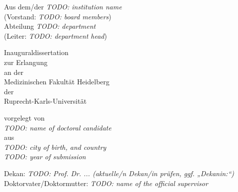 \begin{center}

    Aus dem/der \textit{TODO: institution name} \\

    (Vorstand: \textit{TODO: board members}) \\
    Abteilung \textit{TODO: department} \\
    (Leiter: \textit{TODO: department head})

    \vfill
    
    {\Huge \scshape {\thesistitle \par}} %


    \vfill

    Inauguraldissertation \\
    zur Erlangung \thesisdegreephrase \\ %
    an der \\
    Medizinischen Fakultät Heidelberg \\
    der \\
    Ruprecht-Karls-Universität 

    \vfill

    vorgelegt von \\
    \textit{TODO: name of doctoral candidate} \\
    aus \\
    \textit{TODO: city of birth, and country} \\
    \bigskip
    \textit{TODO: year of submission}

\end{center}

\newpage
\null\newpage
\vspace*{\fill}
 
\noindent Dekan: \textit{TODO: Prof. Dr. ... (aktuelle/n Dekan/in prüfen, ggf. „Dekanin:“)} \\
Doktorvater/Doktormutter: \textit{TODO: name of the official supervisor} 

\newpage
\null\newpage